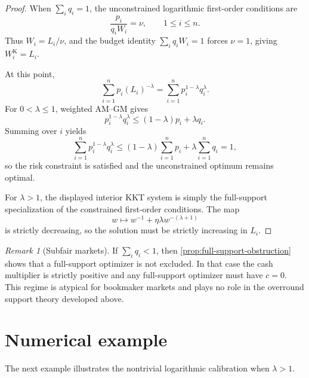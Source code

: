 \documentclass[11pt]{article}
\theoremstyle{definition}
\theoremstyle{remark}
\newtheorem{remark}[theorem]{Remark}
\newcommand{\1}{\mathbf{1}}
\begin{document}
\begin{proof}
When $\sum_i q_i=1$, the unconstrained logarithmic first-order conditions are
\[
\frac{p_i}{q_iW_i}=\nu,
\qquad 1\le i\le n.
\]
Thus $W_i=L_i/\nu$, and the budget identity $\sum_i q_iW_i=1$ forces $\nu=1$, giving $W_i^{\mathrm K}=L_i$.

At this point,
\[
\sum_{i=1}^n p_i(L_i)^{-\lambda}=
\sum_{i=1}^n p_i^{1-\lambda}q_i^{\lambda}.
\]
For $0<\lambda\le 1$, weighted AM--GM gives
\[
p_i^{1-\lambda}q_i^{\lambda}\le (1-\lambda)p_i+\lambda q_i.
\]
Summing over $i$ yields
\[
\sum_{i=1}^n p_i^{1-\lambda}q_i^{\lambda}
\le (1-\lambda)\sum_{i=1}^n p_i+\lambda\sum_{i=1}^n q_i=1,
\]
so the risk constraint is satisfied and the unconstrained optimum remains optimal.

For $\lambda>1$, the displayed interior KKT system is simply the full-support specialization of the constrained first-order conditions. The map
\[
w\mapsto w^{-1}+\eta\lambda w^{-(\lambda+1)}
\]
is strictly decreasing, so the solution must be strictly increasing in $L_i$.
\end{proof}

\begin{remark}[Subfair markets]
If $\sum_i q_i<1$, then \cref{prop:full-support-obstruction} shows that a full-support optimizer is not excluded. In that case the cash multiplier is strictly positive and any full-support optimizer must have $c=0$. This regime is atypical for bookmaker markets and plays no role in the overround support theory developed above.
\end{remark}

\section{Numerical example}
\label{sec:example}

The next example illustrates the nontrivial logarithmic calibration when $\lambda>1$.
\end{document}
